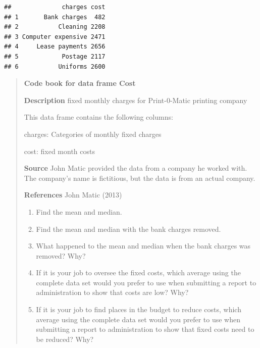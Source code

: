 \documentclass[]{book}
\begin{document}
\begin{verbatim}
##              charges cost
## 1       Bank charges  482
## 2           Cleaning 2208
## 3 Computer expensive 2471
## 4     Lease payments 2656
## 5            Postage 2117
## 6           Uniforms 2600
\end{verbatim}

\begin{quote}
\textbf{Code book for data frame Cost}

\textbf{Description}
fixed monthly charges for Print-0-Matic printing company

This data frame contains the following columns:

charges: Categories of monthly fixed charges

cost: fixed month costs

\textbf{Source}
John Matic provided the data from a company he worked with. The company's name is fictitious, but the data is from an actual company.

\textbf{References}
John Matic (2013)

\begin{enumerate}
\def\labelenumi{\alph{enumi}.}
\item
  Find the mean and median.
\item
  Find the mean and median with the bank charges removed.
\item
  What happened to the mean and median when the bank charges was removed? Why?
\item
  If it is your job to oversee the fixed costs, which average using the complete data set would you prefer to use when submitting a report to administration to show that costs are low? Why?
\item
  If it is your job to find places in the budget to reduce costs, which average using the complete data set would you prefer to use when submitting a report to administration to show that fixed costs need to be reduced? Why?
\end{enumerate}
\end{quote}
\end{document}

